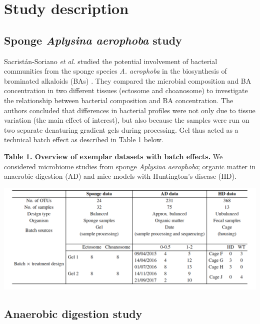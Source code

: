 \documentclass[]{book}
\begin{document}
\section{Study description}\label{study-description}

\subsection{\texorpdfstring{Sponge \emph{Aplysina aerophoba}
study}{Sponge Aplysina aerophoba study}}\label{sponge-aplysina-aerophoba-study}

Sacristán-Soriano \emph{et al.} studied the potential involvement of
bacterial communities from the sponge species \emph{A. aerophoba} in the
biosynthesis of brominated alkaloids (BAs)
\citep{sacristan2011exploring}. They compared the microbial composition
and BA concentration in two different tissues (ectosome and choanosome)
to investigate the relationship between bacterial composition and BA
concentration. The authors concluded that differences in bacterial
profiles were not only due to tissue variation (the main effect of
interest), but also because the samples were run on two separate
denaturing gradient gels during processing. Gel thus acted as a
technical batch effect as described in Table 1 below.

\textbf{Table 1. Overview of exemplar datasets with batch effects.} We
considered microbiome studies from sponge \emph{Aplysina aerophoba};
organic matter in anaerobic digestion (AD) and mice models with
Huntington's disease (HD).

\begin{center}\includegraphics{figures/table} \end{center}

\subsection{Anaerobic digestion study}\label{anaerobic-digestion-study}
\end{document}

